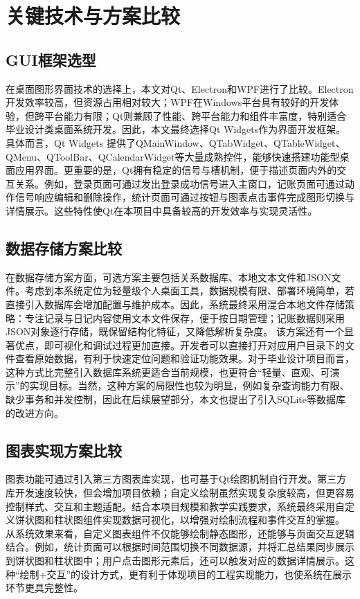 \section{关键技术与方案比较}

\subsection{GUI框架选型}
在桌面图形界面技术的选择上，本文对Qt、Electron和WPF进行了比较。Electron开发效率较高，但资源占用相对较大；WPF在Windows平台具有较好的开发体验，但跨平台能力有限；Qt则兼顾了性能、跨平台能力和组件丰富度，特别适合毕业设计类桌面系统开发。因此，本文最终选择Qt Widgets作为界面开发框架。
具体而言，Qt Widgets 提供了QMainWindow、QTabWidget、QTableWidget、QMenu、QToolBar、QCalendarWidget等大量成熟控件，能够快速搭建功能型桌面应用界面。更重要的是，Qt拥有稳定的信号与槽机制，便于描述页面内外的交互关系。例如，登录页面可通过发出登录成功信号进入主窗口，记账页面可通过动作信号响应编辑和删除操作，统计页面可通过按钮与图表点击事件完成图形切换与详情展示。这些特性使Qt在本项目中具备较高的开发效率与实现灵活性。

\subsection{数据存储方案比较}
在数据存储方案方面，可选方案主要包括关系数据库、本地文本文件和JSON文件。考虑到本系统定位为轻量级个人桌面工具，数据规模有限、部署环境简单，若直接引入数据库会增加配置与维护成本。因此，系统最终采用混合本地文件存储策略：专注记录与日记内容使用文本文件保存，便于按日期管理；记账数据则采用JSON对象逐行存储，既保留结构化特征，又降低解析复杂度。
该方案还有一个显著优点，即可视化和调试过程更加直接。开发者可以直接打开对应用户目录下的文件查看原始数据，有利于快速定位问题和验证功能效果。对于毕业设计项目而言，这种方式比完整引入数据库系统更适合当前规模，也更符合“轻量、直观、可演示”的实现目标。当然，这种方案的局限性也较为明显，例如复杂查询能力有限、缺少事务和并发控制，因此在后续展望部分，本文也提出了引入SQLite等数据库的改进方向。

\subsection{图表实现方案比较}
图表功能可通过引入第三方图表库实现，也可基于Qt绘图机制自行开发。第三方库开发速度较快，但会增加项目依赖；自定义绘制虽然实现复杂度较高，但更容易控制样式、交互和主题适配。结合本项目规模和教学实践要求，系统最终采用自定义饼状图和柱状图组件实现数据可视化，以增强对绘制流程和事件交互的掌握。
从系统效果来看，自定义图表组件不仅能够绘制静态图形，还能够与页面交互逻辑结合。例如，统计页面可以根据时间范围切换不同数据源，并将汇总结果同步展示到饼状图和柱状图中；用户点击图形元素后，还可以触发对应的数据详情展示。这种“绘制+交互”的设计方式，更有利于体现项目的工程实现能力，也使系统在展示环节更具完整性。

